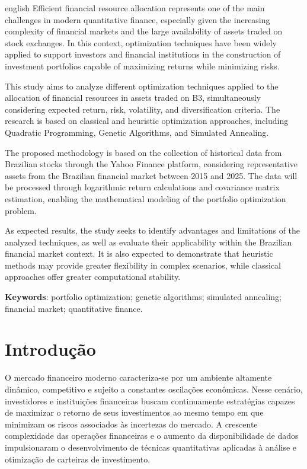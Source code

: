 \documentclass[
  12pt,
  oneside,
  a4paper,
  brazil
]{abntex2}
\begin{document}
\begin{resumo}[Abstract]
\begin{otherlanguage*}{english}
Efficient financial resource allocation represents one of the main challenges in modern quantitative finance, especially given the increasing complexity of financial markets and the large availability of assets traded on stock exchanges. In this context, optimization techniques have been widely applied to support investors and financial institutions in the construction of investment portfolios capable of maximizing returns while minimizing risks.

This study aims to analyze different optimization techniques applied to the allocation of financial resources in assets traded on B3, simultaneously considering expected return, risk, volatility, and diversification criteria. The research is based on classical and heuristic optimization approaches, including Quadratic Programming, Genetic Algorithms, and Simulated Annealing.

The proposed methodology is based on the collection of historical data from Brazilian stocks through the Yahoo Finance platform, considering representative assets from the Brazilian financial market between 2015 and 2025. The data will be processed through logarithmic return calculations and covariance matrix estimation, enabling the mathematical modeling of the portfolio optimization problem.

As expected results, the study seeks to identify advantages and limitations of the analyzed techniques, as well as evaluate their applicability within the Brazilian financial market context. It is also expected to demonstrate that heuristic methods may provide greater flexibility in complex scenarios, while classical approaches offer greater computational stability.

\textbf{Keywords}: portfolio optimization; genetic algorithms; simulated annealing; financial market; quantitative finance.
\end{otherlanguage*}
\end{resumo}

\textual

\chapter{Introdução}
O mercado financeiro moderno caracteriza-se por um ambiente altamente dinâmico, competitivo e sujeito a constantes oscilações econômicas. Nesse cenário, investidores e instituições financeiras buscam continuamente estratégias capazes de maximizar o retorno de seus investimentos ao mesmo tempo em que minimizam os riscos associados às incertezas do mercado. A crescente complexidade das operações financeiras e o aumento da disponibilidade de dados impulsionaram o desenvolvimento de técnicas quantitativas aplicadas à análise e otimização de carteiras de investimento.
\end{document}
